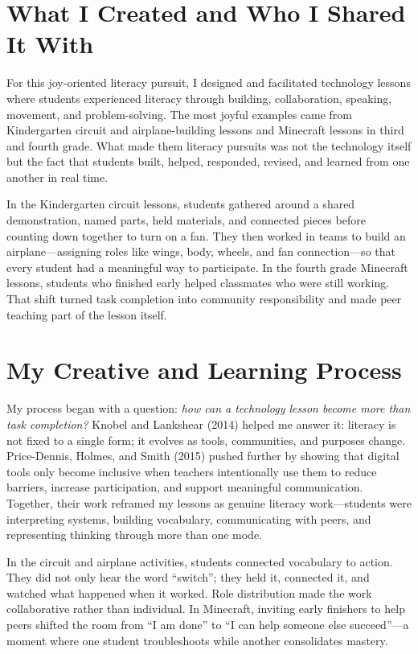 \documentclass[11pt]{article}
\begin{document}
\doublespacing

\section*{What I Created and Who I Shared It With}

For this joy-oriented literacy pursuit, I designed and facilitated technology lessons where students experienced literacy through building, collaboration, speaking, movement, and problem-solving. The most joyful examples came from Kindergarten circuit and airplane-building lessons and Minecraft lessons in third and fourth grade. What made them literacy pursuits was not the technology itself but the fact that students built, helped, responded, revised, and learned from one another in real time.

In the Kindergarten circuit lessons, students gathered around a shared demonstration, named parts, held materials, and connected pieces before counting down together to turn on a fan. They then worked in teams to build an airplane---assigning roles like wings, body, wheels, and fan connection---so that every student had a meaningful way to participate. In the fourth grade Minecraft lessons, students who finished early helped classmates who were still working. That shift turned task completion into community responsibility and made peer teaching part of the lesson itself.

\section*{My Creative and Learning Process}

My process began with a question: \textit{how can a technology lesson become more than task completion?} Knobel and Lankshear (2014) helped me answer it: literacy is not fixed to a single form; it evolves as tools, communities, and purposes change. Price-Dennis, Holmes, and Smith (2015) pushed further by showing that digital tools only become inclusive when teachers intentionally use them to reduce barriers, increase participation, and support meaningful communication. Together, their work reframed my lessons as genuine literacy work---students were interpreting systems, building vocabulary, communicating with peers, and representing thinking through more than one mode.

In the circuit and airplane activities, students connected vocabulary to action. They did not only hear the word ``switch''; they held it, connected it, and watched what happened when it worked. Role distribution made the work collaborative rather than individual. In Minecraft, inviting early finishers to help peers shifted the room from ``I am done'' to ``I can help someone else succeed''---a moment where one student troubleshoots while another consolidates mastery.
\end{document}
